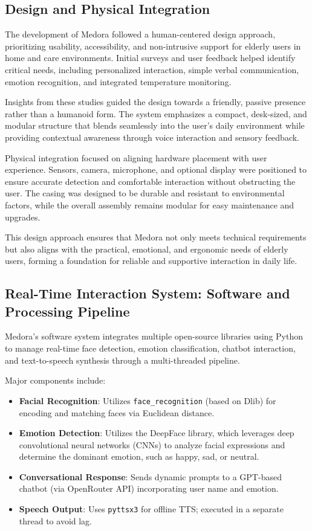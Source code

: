 \subsection{Design and Physical Integration}

The development of Medora followed a human-centered design approach, prioritizing usability, accessibility, and non-intrusive support for elderly users in home and care environments. Initial surveys and user feedback helped identify critical needs, including personalized interaction, simple verbal communication, emotion recognition, and integrated temperature monitoring.  

Insights from these studies guided the design towards a friendly, passive presence rather than a humanoid form. The system emphasizes a compact, desk-sized, and modular structure that blends seamlessly into the user’s daily environment while providing contextual awareness through voice interaction and sensory feedback.

Physical integration focused on aligning hardware placement with user experience. Sensors, camera, microphone, and optional display were positioned to ensure accurate detection and comfortable interaction without obstructing the user. The casing was designed to be durable and resistant to environmental factors, while the overall assembly remains modular for easy maintenance and upgrades.  

This design approach ensures that Medora not only meets technical requirements but also aligns with the practical, emotional, and ergonomic needs of elderly users, forming a foundation for reliable and supportive interaction in daily life.


\subsection{Real-Time Interaction System: Software and Processing Pipeline}

Medora’s software system integrates multiple open-source libraries using Python to manage real-time face detection, emotion classification, chatbot interaction, and text-to-speech synthesis through a multi-threaded pipeline.

Major components include:

\begin{itemize}
    \item \textbf{Facial Recognition}: Utilizes \texttt{face\_recognition} (based on Dlib) for encoding and matching faces via Euclidean distance.
    \item \textbf{Emotion Detection}: Utilizes the DeepFace library, which leverages deep convolutional neural networks (CNNs) to analyze facial expressions and determine the dominant emotion, such as happy, sad, or neutral.
    \item \textbf{Conversational Response}: Sends dynamic prompts to a GPT-based chatbot (via OpenRouter API) incorporating user name and emotion.
    \item \textbf{Speech Output}: Uses \texttt{pyttsx3} for offline TTS; executed in a separate thread to avoid lag.
\end{itemize}

